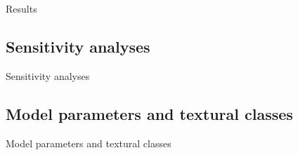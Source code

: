 \justifying
% 
{\rmfamily
Results
}
\subsection{Sensitivity analyses}
\begin{block}{Sensitivity analyses}
\end{block}


\subsection{Model parameters and textural classes}
\begin{block}{Model parameters and textural classes}
\end{block}


